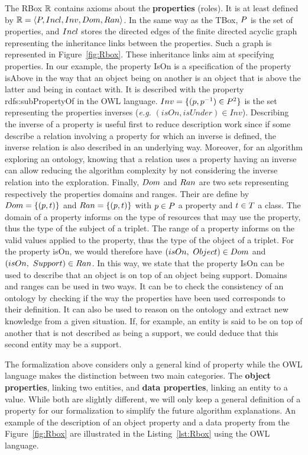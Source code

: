 The RBox $\mathbb{R}$ contains axioms about the \textbf{properties} (roles). It is at least defined by $\mathbb{R} = \langle P, Incl, Inv, Dom, Ran \rangle$. In the same way as the TBox, $P$ is the set of properties, and $Incl$ stores the directed edges of the finite directed acyclic graph representing the inheritance links between the properties. Such a graph is represented in Figure~\ref{fig:Rbox}. These inheritance links aim at specifying properties. In our example, the property IsOn is a specification of the property isAbove in the way that an object being on another is an object that is above the latter and being in contact with. It is described with the property rdfs:subPropertyOf in the OWL language. 
$Inv = \{(p, p^{-1}) \in P^2\}$ is the set representing the properties inverses (\textit{e.g.} $(isOn, isUnder) \in Inv$). Describing the inverse of a property is useful first to reduce description work since if some describe a relation involving a property for which an inverse is defined, the inverse relation is also described in an underlying way. Moreover, for an algorithm exploring an ontology, knowing that a relation uses a property having an inverse can allow reducing the algorithm complexity by not considering the inverse relation into the exploration.
Finally, $Dom$ and $Ran$ are two sets representing respectively the properties domains and ranges. Their are define by $Dom = \{(p, t)\}$ and $Ran = \{(p, t)\}$ with $p \in P$ a property and $t \in T$ a class. The domain of a property informs on the type of resources that may use the property, thus the type of the subject of a triplet. The range of a property informs on the valid values applied to the property, thus the type of the object of a triplet. For the property isOn, we would therefore have $(isOn,\ Object) \in Dom$ and $(isOn,\ Support) \in Ran$. In this way, we state that the property IsOn can be used to describe that an object is on top of an object being support. Domains and ranges can be used in two ways. It can be to check the consistency of an ontology by checking if the way the properties have been used corresponds to their definition. It can also be used to reason on the ontology and extract new knowledge from a given situation. If, for example, an entity is said to be on top of another that is not described as being a support, we could deduce that this second entity may be a support.

The formalization above considers only a general kind of property while the OWL language makes the distinction between two main categories. The \textbf{object properties}, linking two entities, and \textbf{data properties}, linking an entity to a value. While both are slightly different, we will only keep a general definition of a property for our formalization to simplify the future algorithm explanations. An example of the description of an object property and a data property from the Figure~\ref{fig:Rbox} are illustrated in the Listing~\ref{lst:Rbox} using the OWL language.

